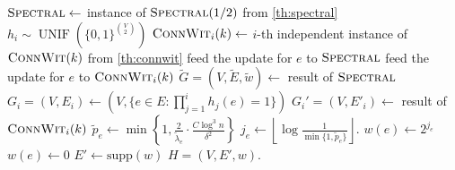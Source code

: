 \documentclass[epsfig,letter,11pt]{article}
\numberwithin{equation}{section}
\DeclareMathOperator{\unif}{UNIF}
\renewcommand{\tilde}{\widetilde}
\newcommand*{\supp}{\mathrm{supp}}
\begin{document}
\begin{algorithm}
	\caption{\textsc{agm}: sparsifier construction in dynamic streams}
	\label{alg:dynsampling}
	
	\begin{algorithmic}[1]
		\Statex
		\State $\textsc{Spectral}\gets $ instance of $\textsc{Spectral}(1/2)$ from \cref{th:spectral}
		\State $h_i \sim \unif\left(\{0,1\}^{\binom{V}{2}}\right)$ 
		\State $\textsc{ConnWit}_i(k) \gets $ $i$-th independent instance of $\textsc{ConnWit}(k)$ from \cref{th:connwit} \label{lineagm:feedconnwit}
		\EndFor
		\EndProcedure
		\Statex
		 
		\State feed the update for $e$ to $\textsc{Spectral}$
		\State feed the update for $e$ to $\textsc{ConnWit}_i(k)$
		\EndIf
		\EndFor
		\EndProcedure
		\Statex
		\State $\tilde{G}=(V,\tilde{E},\tilde{w}) \gets $ result of $\textsc{Spectral}$
		\State $G_i= (V,E_i) \gets (V,\{e \in E: \prod_{j = 1}^{i} h_j(e)=1\})$ 
		\State $G_i'=(V,E'_i) \gets $ result of $\textsc{ConnWit}_i(k)$ 
		\EndFor
		\State $\tilde{p}_e \gets \min \left\{1, \frac{2}{\tilde{\lambda}_e}\cdot\frac{C \log^3 n}{\delta^2} \right\} $
		\State $j_e \gets  \left\lfloor \log \frac{1}{\min\{1, \tilde{p}_e\}}\right\rfloor $.
		\State $w(e) \gets 2^{j_e}$
		\Else
		\State $w(e)\gets 0$
		\EndIf
		\EndFor
		\State $E' \gets \supp(w)$
		\State \Return $H=(V,E',w)$.
		\EndProcedure
	\end{algorithmic}
\end{algorithm}
\end{document}

